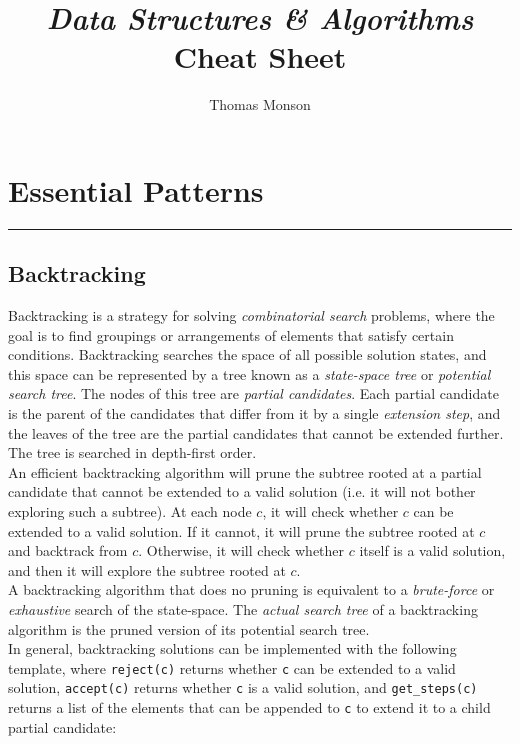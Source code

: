 \documentclass[12pt, titlepage]{article}
\title{\textit{Data Structures \& Algorithms} Cheat Sheet}
\author{Thomas Monson}
\date{}
\begin{document}
\maketitle

\tableofcontents

\section{Essential Patterns}
\hrule\vspace{5ex}

\subsection{Backtracking}

Backtracking is a strategy for solving \textit{combinatorial search} problems, where the goal is to find groupings or arrangements of elements that satisfy certain conditions. Backtracking searches the space of all possible solution states, and this space can be represented by a tree known as a \textit{state-space tree} or \textit{potential search tree}. The nodes of this tree are \textit{partial candidates}. Each partial candidate is the parent of the candidates that differ from it by a single \textit{extension step}, and the leaves of the tree are the partial candidates that cannot be extended further. The tree is searched in depth-first order. \\

An efficient backtracking algorithm will prune the subtree rooted at a partial candidate that cannot be extended to a valid solution (i.e. it will not bother exploring such a subtree). At each node $c$, it will check whether $c$ can be extended to a valid solution. If it cannot, it will prune the subtree rooted at $c$ and backtrack from $c$. Otherwise, it will check whether $c$ itself is a valid solution, and then it will explore the subtree rooted at $c$. \\

A backtracking algorithm that does no pruning is equivalent to a \textit{brute-force} or \textit{exhaustive} search of the state-space. The \textit{actual search tree} of a backtracking algorithm is the pruned version of its potential search tree. \\

In general, backtracking solutions can be implemented with the following template, where \texttt{reject(c)} returns whether \texttt{c} can be extended to a valid solution, \texttt{accept(c)} returns whether \texttt{c} is a valid solution, and \texttt{get\_steps(c)} returns a list of the elements that can be appended to \texttt{c} to extend it to a child partial candidate: \medskip
\end{document}

